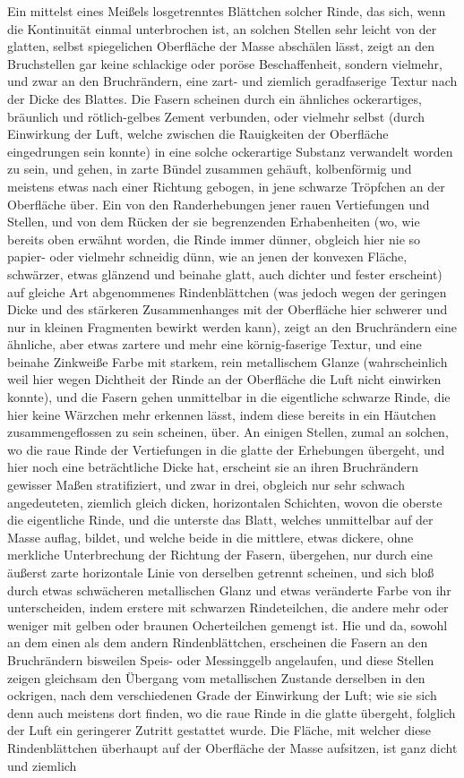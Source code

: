 \documentclass[a4paper, 11pt, oneside, german]{article}
\begin{document}
Ein mittelst eines Meißels losgetrenntes Blättchen solcher Rinde, das sich, wenn die Kontinuität einmal unterbrochen ist, an solchen Stellen sehr leicht von der glatten, selbst spiegelichen Oberfläche der Masse abschälen lässt, zeigt an den Bruchstellen gar keine schlackige oder poröse Beschaffenheit, sondern vielmehr, und zwar an den Bruchrändern, eine zart- und ziemlich geradfaserige Textur nach der Dicke des Blattes. Die Fasern scheinen durch ein ähnliches ockerartiges, bräunlich und rötlich-gelbes Zement verbunden, oder vielmehr selbst (durch Einwirkung der Luft, welche zwischen die Rauigkeiten der Oberfläche eingedrungen sein konnte) in eine solche ockerartige Substanz verwandelt worden zu sein, und gehen, in zarte Bündel zusammen gehäuft, kolbenförmig und meistens etwas nach einer Richtung gebogen, in jene schwarze Tröpfchen an der Oberfläche über. Ein von den Randerhebungen jener rauen Vertiefungen und Stellen, und von dem Rücken der sie begrenzenden Erhabenheiten (wo, wie bereits oben erwähnt worden, die Rinde immer dünner, obgleich hier nie so papier- oder vielmehr schneidig dünn, wie an jenen der konvexen Fläche, schwärzer, etwas glänzend und beinahe glatt, auch dichter und fester erscheint) auf gleiche Art abgenommenes Rindenblättchen (was jedoch wegen der geringen Dicke und des stärkeren Zusammenhanges mit der Oberfläche hier schwerer und nur in kleinen Fragmenten bewirkt werden kann), zeigt an den Bruchrändern eine ähnliche, aber etwas zartere und mehr eine körnig-faserige Textur, und eine beinahe Zinkweiße Farbe mit starkem, rein metallischem Glanze (wahrscheinlich weil hier wegen Dichtheit der Rinde an der Oberfläche die Luft nicht einwirken konnte), und die Fasern gehen unmittelbar in die eigentliche schwarze Rinde, die hier keine Wärzchen mehr erkennen lässt, indem diese bereits in ein Häutchen zusammengeflossen zu sein scheinen, über. An einigen Stellen, zumal an solchen, wo die raue Rinde der Vertiefungen in die glatte der Erhebungen übergeht, und hier noch eine beträchtliche Dicke hat, erscheint sie an ihren Bruchrändern gewisser Maßen stratifiziert, und zwar in drei, obgleich nur sehr schwach angedeuteten, ziemlich gleich dicken, horizontalen Schichten, wovon die oberste die eigentliche Rinde, und die unterste das Blatt, welches unmittelbar auf der Masse auflag, bildet, und welche beide in die mittlere, etwas dickere, ohne merkliche Unterbrechung der Richtung der Fasern, übergehen, nur durch eine äußerst zarte horizontale Linie von derselben getrennt scheinen, und sich bloß durch etwas schwächeren metallischen Glanz und etwas veränderte Farbe von ihr unterscheiden, indem erstere mit schwarzen Rindeteilchen, die andere mehr oder weniger mit gelben oder braunen Ocherteilchen gemengt ist. Hie und da, sowohl an dem einen als dem andern Rindenblättchen, erscheinen die Fasern an den Bruchrändern bisweilen Speis- oder Messinggelb angelaufen, und diese Stellen zeigen gleichsam den Übergang vom metallischen Zustande derselben in den ockrigen, nach dem verschiedenen Grade der Einwirkung der Luft; wie sie sich denn auch meistens dort finden, wo die raue Rinde in die glatte übergeht, folglich der Luft ein geringerer Zutritt gestattet wurde. Die Fläche, mit welcher diese Rindenblättchen überhaupt auf der Oberfläche der Masse aufsitzen, ist ganz dicht und ziemlich 
\end{document}
